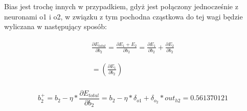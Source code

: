 Bias jest trochę innych w przypadkiem, gdyż jest połączony jednocześnie z neuronami o1 i o2, w związku z tym pochodna cząstkowa do tej wagi będzie wyliczana w następujący sposób:

\begin{gather}
  \begin{aligned}
    \frac{\partial E_{total}}{\partial b_2} = \frac{\partial E_1+E_2}{\partial b_2}=\frac{\partial E_1}{\partial b_2}+\frac{\partial E_2}{\partial b_2}
  \end{aligned}\\
  \begin{aligned}\\
    = (\frac{\partial E_1}{\partial b_2})
  \end{aligned}\\
\end{gather}


\[
  b_2^{+} = b_2 - \eta * \frac{\partial E_{total}}{\partial b_2} = b_2 - \eta * \delta_{o1}+\delta_{o_2}  * out_{h2} = 0.561370121
\]









